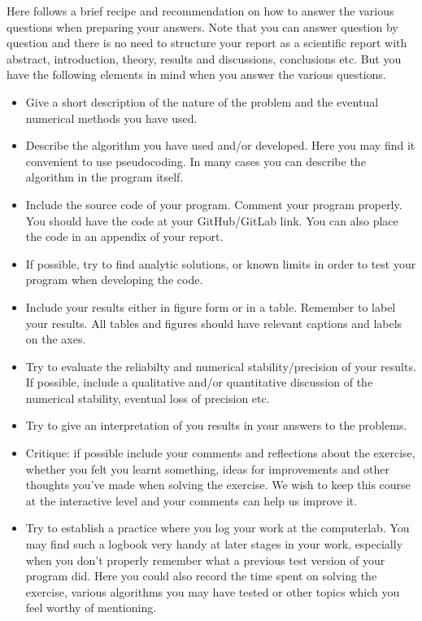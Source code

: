 \documentclass[%
oneside,                 %
final,                   %
10pt]{article}
\begin{document}
Here follows a brief recipe and recommendation on how to answer the various questions when preparing your answers. Note that you can answer question by question and there is no need to structure your report as a scientific report with abstract, introduction, theory, results and discussions, conclusions etc. But you have the following elements in mind when you answer the various questions.


\begin{itemize}
  \item Give a short description of the nature of the problem and the eventual  numerical methods you have used.

  \item Describe the algorithm you have used and/or developed. Here you may find it convenient to use pseudocoding. In many cases you can describe the algorithm in the program itself.

  \item Include the source code of your program. Comment your program properly. You should have the code at your GitHub/GitLab link. You can also place the code in an appendix of your report.

  \item If possible, try to find analytic solutions, or known limits in order to test your program when developing the code.

  \item Include your results either in figure form or in a table. Remember to        label your results. All tables and figures should have relevant captions        and labels on the axes.

  \item Try to evaluate the reliabilty and numerical stability/precision of your results. If possible, include a qualitative and/or quantitative discussion of the numerical stability, eventual loss of precision etc.

  \item Try to give an interpretation of you results in your answers to  the problems.

  \item Critique: if possible include your comments and reflections about the  exercise, whether you felt you learnt something, ideas for improvements and  other thoughts you've made when solving the exercise. We wish to keep this course at the interactive level and your comments can help us improve it.

  \item Try to establish a practice where you log your work at the  computerlab. You may find such a logbook very handy at later stages in your work, especially when you don't properly remember  what a previous test version  of your program did. Here you could also record  the time spent on solving the exercise, various algorithms you may have tested or other topics which you feel worthy of mentioning.
\end{itemize}
\end{document}
